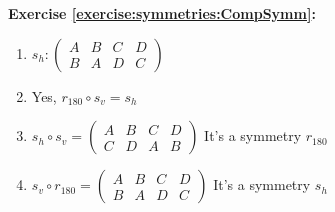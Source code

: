 \noindent\textbf{Exercise \ref{exercise:symmetries:CompSymm}:}
\begin{enumerate}[{a.}]
\item
$s_h: \begin{pmatrix}
A & B & C & D\\
B & A & D & C
\end{pmatrix}$
\item
Yes, $r_{180}\circ s_v=s_h$
\item
$s_h\circ s_v=\begin{pmatrix}
A & B & C & D\\
C & D & A & B
\end{pmatrix}$
It's a symmetry $r_{180}$
\item
$s_v\circ r_{180}=\begin{pmatrix}
A & B & C & D\\
B & A & D & C
\end{pmatrix}$
It's a symmetry $s_h$
\end{enumerate}

